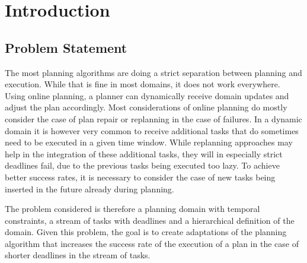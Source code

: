\section{Introduction}\label{sec:introduction}


\subsection{Problem Statement}

The most planning algorithms are doing a strict separation between planning and execution.
While that is fine in most domains, it does not work everywhere.
Using online planning, a planner can dynamically receive domain updates and adjust the plan accordingly.
Most considerations of online planning do mostly consider the case of plan repair or replanning in the case of failures.
In a dynamic domain it is however very common to receive additional tasks that do sometimes need to be executed in a given time window.
While replanning approaches may help in the integration of these additional tasks, they will in especially strict deadlines fail, due to the previous tasks being executed too lazy.
To achieve better success rates, it is necessary to consider the case of new tasks being inserted in the future already during planning.

The problem considered is therefore a planning domain with temporal constraints, a stream of tasks with deadlines and a hierarchical definition of the domain.
Given this problem, the goal is to create adaptations of the planning algorithm that increases the success rate of the execution of a plan in the case of shorter deadlines in the stream of tasks.